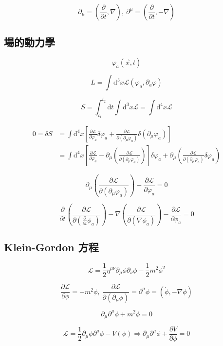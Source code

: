 \documentclass{article}
\begin{document}
$$\partial_{\mu}=(\frac{\partial}{\partial t},\nabla),\ \partial^{\mu}=(\frac{\partial}{\partial t},-\nabla)$$

\subsection{場的動力學}

$$\varphi_a(\vec{x},t)$$

$$L=\int\mathrm{d}^3x\mathcal{L}(\varphi_a,\partial_a\varphi)$$

$$S=\int_{t_{1}}^{t_{2}}\mathrm{d}t\int \mathrm{d}^{3} x \mathcal{L}=\int \mathrm{d}^{4} x \mathcal{L}$$

$$
\begin{aligned}
0=\delta S & =\int\mathrm{d}^4x[\frac{\partial\mathcal{L}}{\partial\varphi_a}\delta\varphi_a+\frac{\partial\mathcal{L}}{\partial(\partial_\mu\varphi_a)}\delta(\partial_\mu\varphi_a)]                                                                           \\
& =\int\mathrm{d}^4x[\frac{\partial\mathcal{L}}{\partial\varphi_a}-\partial_\mu(\frac{\partial\mathcal{L}}{\partial(\partial_\mu\varphi_a)})]\delta\varphi_a+\partial_\mu(\frac{\partial\mathcal{L}}{\partial(\partial_\mu\varphi_a)}\delta\varphi_a)
\end{aligned}$$

$$\partial_\mu(\frac{\partial\mathcal{L}}{\partial(\partial_\mu\varphi_a)})-\frac{\partial\mathcal{L}}{\partial\varphi_a}=0$$

$$\frac{\partial}{\partial t}(\frac{\partial\mathcal{L}}{\partial(\frac{\partial}{\partial t}\phi_{a})})-\nabla(\frac{\partial\mathcal{L}}{\partial(\nabla\phi_{a})})-\frac{\partial\mathcal{L}}{\partial\phi_{a}}=0$$

\subsection{Klein-Gordon 方程}

$$\mathcal{L}=\frac{1}{2}\eta^{\mu\nu}\partial_{\mu}\phi\partial_{\nu}\phi-\frac{1}{2}m^2\phi^2$$

$$\frac{\partial\mathcal{L}}{\partial\phi}=-m^2\phi,\ \frac{\partial\mathcal{L}}{\partial(\partial_{\mu}\phi)}=\partial^{\mu}\phi=(\dot{\phi},-\nabla\phi)$$

$$\partial_{\mu}\partial^{\mu}\phi+m^2\phi=0$$

$$\mathcal{L}=\frac{1}{2}\partial_{\mu}\phi\partial^{\mu}\phi-V(\phi)\Rightarrow\partial_{\mu}\partial^{\mu}\phi+\frac{\partial V}{\partial\phi}=0$$
\end{document}
